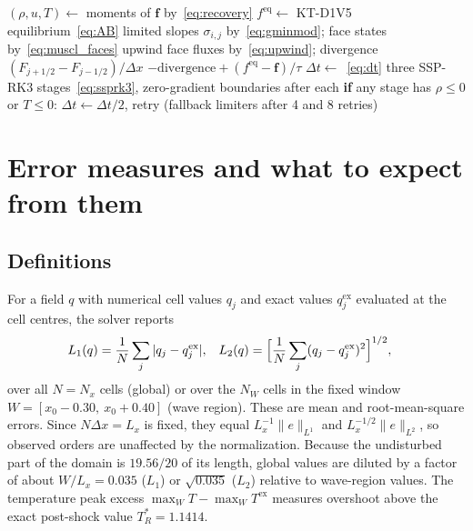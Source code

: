 \documentclass[11pt]{article}
\theoremstyle{remark}
\newcommand{\feq}{f^{\mathrm{eq}}}
\begin{document}
\begin{algorithm}[ht]
\caption{One accepted time step of the solver}
\label{alg:step}
\begin{algorithmic}[1]
  \State $(\rho,u,T)\gets$ moments of $\mathbf f$ by~\eqref{eq:recovery}
  \State $\feq\gets$ KT-D1V5 equilibrium~\eqref{eq:AB}
     \State limited slopes $\sigma_{i,j}$ by~\eqref{eq:gminmod}; face states by~\eqref{eq:muscl_faces}
     \State upwind face fluxes by~\eqref{eq:upwind}; divergence $(F_{j+1/2}-F_{j-1/2})/\Delta x$
  \EndFor
  \State \Return $-\text{divergence} + (\feq - \mathbf f)/\tau$
\EndFunction
\State $\Delta t\gets$~\eqref{eq:dt}
\Repeat
  \State three SSP-RK3 stages~\eqref{eq:ssprk3}, zero-gradient boundaries after each
  \State \textbf{if} any stage has $\rho\le0$ or $T\le0$: $\Delta t\gets\Delta t/2$, retry (fallback limiters after 4 and 8 retries)
\end{algorithmic}
\end{algorithm}

\section{Error measures and what to expect from them}
\label{sec:metrics}

\subsection{Definitions}
For a field $q$ with numerical cell values $q_j$ and exact values $q^{\mathrm{ex}}_j$
evaluated at the cell centres, the solver reports
\begin{align}
  L_1(q) &= \frac1{N}\sum_{j}|q_j - q^{\mathrm{ex}}_j|, &
  L_2(q) &= \Bigl[\frac1{N}\sum_{j}(q_j - q^{\mathrm{ex}}_j)^2\Bigr]^{1/2}, \label{eq:norms}
\end{align}
over all $N=N_x$ cells (global) or over the $N_W$ cells in the fixed window
$W = [x_0-0.30,\ x_0+0.40]$ (wave region).  These are mean and root-mean-square
errors.  Since $N\Delta x = L_x$ is fixed, they equal $L_x^{-1}\|e\|_{L^1}$ and
$L_x^{-1/2}\|e\|_{L^2}$, so observed orders are unaffected by the normalization.
Because the undisturbed part of the domain is $19.56/20$ of its length, global
values are diluted by a factor of about $W/L_x = 0.035$ ($L_1$) or $\sqrt{0.035}$ ($L_2$)
relative to wave-region values.
The temperature peak excess
$\max_{W}T - \max_{W}T^{\mathrm{ex}}$ measures overshoot above the exact post-shock
value $T^*_R=1.1414$.
\end{document}
